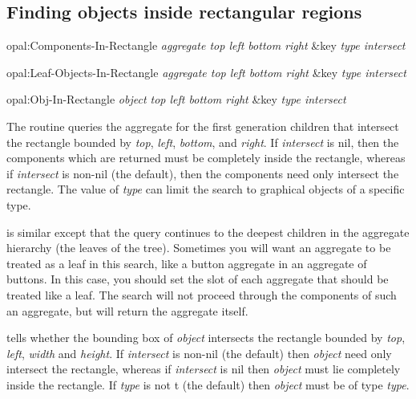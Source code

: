 \begin{group}
\section{Finding objects inside rectangular regions}
\label{rect-regions}

\vspace{1 line}
\begin{programexample}
opal:Components-In-Rectangle {\it aggregate  top  left  bottom  right} \&key {\it type  intersect}\value{function}
\end{programexample}

\begin{programexample}
opal:Leaf-Objects-In-Rectangle {\it aggregate  top  left  bottom  right} \&key {\it type  intersect}\value{function}
\end{programexample}

\begin{programexample}
opal:Obj-In-Rectangle {\it object  top  left  bottom  right} \&key {\it type intersect}\value{function}
\end{programexample}

The routine  queries the aggregate for the first
generation children that intersect the rectangle bounded by {\it top}, {\it left},
{\it bottom}, and {\it right}.  If {\it intersect} is {\sc nil}, then the
components which
are returned must be completely inside the rectangle, whereas if
{\it intersect} is non-{\sc nil} (the default), then the components need only
intersect the rectangle.  The value of {\it type} can limit the search
to graphical objects of a specific type.
\end{group}
\vspace{1 line}


 is similar except that the query
continues to the deepest children in the aggregate hierarchy (the
leaves of the tree).  Sometimes you will want an aggregate to be
treated as a leaf in this search, like a button aggregate in an
aggregate of buttons.  In this case, you should set the
  slot of each
aggregate that should be treated like a leaf.  The search will not
proceed through the components of such an aggregate, but will return
the aggregate itself.

 tells whether the bounding box of {\it object}
intersects the rectangle bounded by {\it top}, {\it left}, {\it width} and
{\it height}.  If {\it intersect} is non-{\sc nil} (the default)
then {\it object} need only intersect the rectangle, whereas if
{\it intersect} is {\sc nil} then {\it object} must lie completely inside the
rectangle.  If {\it type} is not {\sc t} (the default) then {\it object} must be
of type {\it type}.



